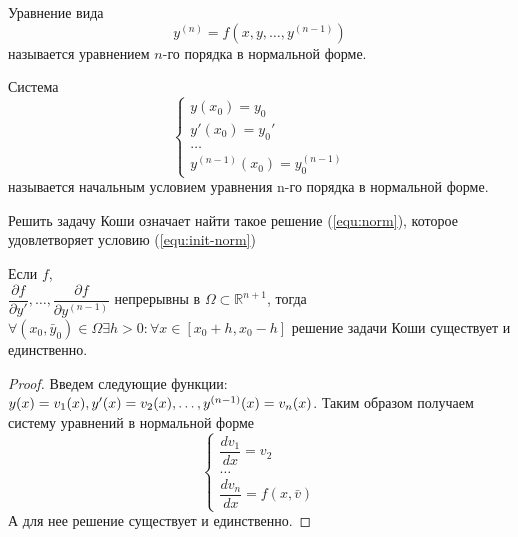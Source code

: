 \begin{definition}
	Уравнение вида
	\begin{equation}
		\label{equ:norm}
		y^{(n)} = f(x, y, \dots, y^{(n-1)})
	\end{equation}
	называется уравнением $n$-го порядка в нормальной форме.
\end{definition}

\begin{definition}
	Система
	\begin{equation}
		\label{equ:init-norm}
		\begin{cases*}
			y(x_0) = y_0\\
			y'(x_0) = y_0'\\
			\dots \\
			y^{(n-1)}(x_0) = y^{(n-1)}_0
		\end{cases*}
	\end{equation}
	называется начальным условием уравнения n-го порядка в нормальной форме.
\end{definition}

\begin{proposition}
	Решить задачу Коши означает найти такое решение (\ref{equ:norm}), которое удовлетворяет условию (\ref{equ:init-norm})
\end{proposition}

\begin{theorem}
	Если $f$, \\ $\dfrac{\partial f}{\partial y'}, \dots, \dfrac{\partial f}{\partial y^{(n-1)}}$ непрерывны в $\Omega \subset \mathbb{R}^{n+1}$, тогда $\forall (x_0, \bar{y}_0) \in \Omega \exists h > 0: \forall x\in [x_0 +h, x_0-h]$ решение задачи Коши существует и единственно.
\end{theorem}

\begin{proof}
	Введем следующие функции: $y(x) = v_1(x), y'(x) = v_2(x), \dots, y^{(n-1)}(x) \hm= v_n(x)$. Таким образом получаем систему уравнений в нормальной форме
	\begin{equation}
		\begin{cases*}
			\dfrac{dv_1}{dx} = v_2\\
			\dots\\
			\dfrac{dv_n}{dx} = f(x, \bar{v})
		\end{cases*}
	\end{equation}
	А для нее решение существует и единственно.
\end{proof}
